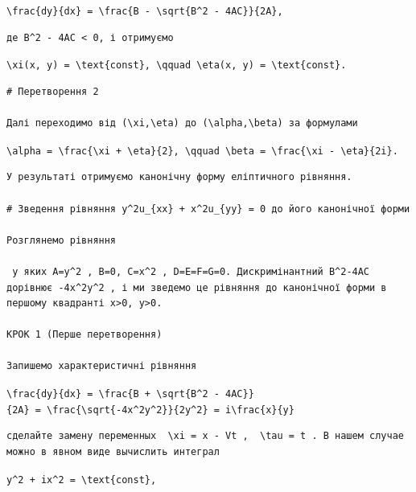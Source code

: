 \documentclass[
  ukrainian,
]{article}
\begin{document}
\texttt{\textbackslash{}frac\{dy\}\{dx\}\ =\ \textbackslash{}frac\{B\ -\ \textbackslash{}sqrt\{B\^{}2\ -\ 4AC\}\}\{2A\},}

\begin{verbatim}
де B^2 - 4AC < 0, і отримуємо
\end{verbatim}

\texttt{\textbackslash{}xi(x,\ y)\ =\ \textbackslash{}text\{const\},\ \textbackslash{}qquad\ \textbackslash{}eta(x,\ y)\ =\ \textbackslash{}text\{const\}.}

\begin{verbatim}
# Перетворення 2

Далі переходимо від (\xi,\eta) до (\alpha,\beta) за формулами
\end{verbatim}

\texttt{\textbackslash{}alpha\ =\ \textbackslash{}frac\{\textbackslash{}xi\ +\ \textbackslash{}eta\}\{2\},\ \textbackslash{}qquad\ \textbackslash{}beta\ =\ \textbackslash{}frac\{\textbackslash{}xi\ -\ \textbackslash{}eta\}\{2i\}.}

\begin{verbatim}
У результаті отримуємо канонічну форму еліптичного рівняння.

# Зведення рівняння y^2u_{xx} + x^2u_{yy} = 0 до його канонічної форми

Розглянемо рівняння

 у яких A=y^2 , B=0, C=x^2 , D=E=F=G=0. Дискримінантний B^2-4AC дорівнює -4x^2y^2 , і ми зведемо це рівняння до канонічної форми в першому квадранті x>0, y>0.

КРОК 1 (Перше перетворення)

Запишемо характеристичні рівняння
\end{verbatim}

\texttt{\textbackslash{}frac\{dy\}\{dx\}\ =\ \textbackslash{}frac\{B\ +\ \textbackslash{}sqrt\{B\^{}2\ -\ 4AC\}\}\{2A\}\ =\ \textbackslash{}frac\{\textbackslash{}sqrt\{-4x\^{}2y\^{}2\}\}\{2y\^{}2\}\ =\ i\textbackslash{}frac\{x\}\{y\}}

\begin{verbatim}
сделайте замену переменных  \xi = x - Vt ,  \tau = t . В нашем случае можно в явном виде вычислить интеграл
\end{verbatim}

\texttt{y\^{}2\ +\ ix\^{}2\ =\ \textbackslash{}text\{const\},}
\end{document}
